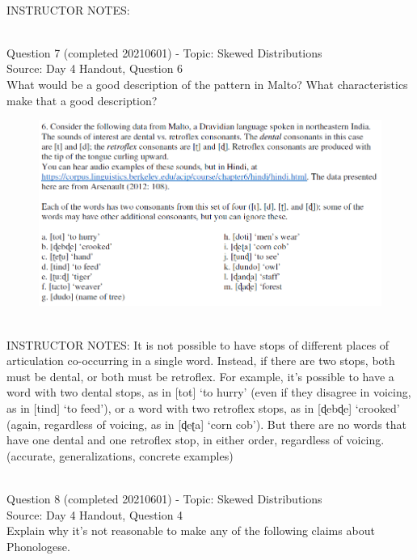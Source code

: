 \documentclass[12pt]{article}
\begin{document}
~\\
INSTRUCTOR NOTES: 


~\\

{\large Question 7} (completed 20210601) - Topic: Skewed Distributions\\
Source: Day 4 Handout, Question 6\\

What would be a good description of the pattern in Malto? What characteristics make that a good description?\\

\begin{figure}[H]
\includegraphics{../images/malto.png}
\end{figure}

~\\
INSTRUCTOR NOTES: It is not possible to have stops of different places of articulation co-occurring in a single word. Instead, if there are two stops, both must be dental, or both must be retroflex. For example, it’s possible to have a word with two dental stops, as in [tot] ‘to hurry’ (even if they disagree in voicing, as in [tind] ‘to feed’), or a word with two retroflex stops, as in [ɖebɖe] ‘crooked’ (again, regardless of voicing, as in [ɖeʈa] ‘corn cob’). But there are no words that have one dental and one retroflex stop, in either order, regardless of voicing. (accurate, generalizations, concrete examples)


~\\

{\large Question 8} (completed 20210601) - Topic: Skewed Distributions\\
Source: Day 4 Handout, Question 4\\

Explain why it's not reasonable to make any of the following claims about Phonologese.\\
\end{document}

